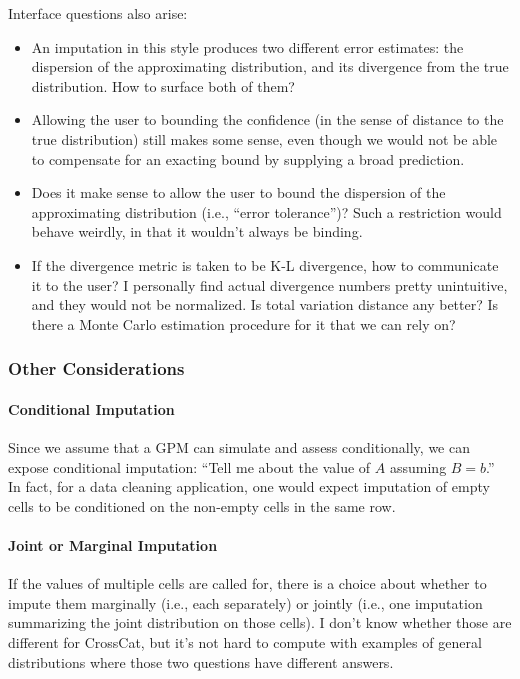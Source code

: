 \documentclass[10pt,letterpaper]{article}
\begin{document}
Interface questions also arise:
\begin{itemize}
\item An imputation in this style produces two different error
  estimates: the dispersion of the approximating distribution, and its
  divergence from the true distribution.  How to surface both of them?
\item Allowing the user to bounding the confidence (in the sense of
  distance to the true distribution) still makes some sense, even
  though we would not be able to compensate for an exacting bound by
  supplying a broad prediction.
\item Does it make sense to allow the user to bound the dispersion of
  the approximating distribution (i.e., ``error tolerance'')?  Such a
  restriction would behave weirdly, in that it wouldn't always be
  binding.
\item If the divergence metric is taken to be K-L divergence, how to
  communicate it to the user?  I personally find actual divergence
  numbers pretty unintuitive, and they would not be normalized.  Is
  total variation distance any better?  Is there a Monte Carlo
  estimation procedure for it that we can rely on?
\end{itemize}

\subsubsection{Other Considerations}

\paragraph{Conditional Imputation}
Since we assume that a GPM can simulate and assess conditionally, we
can expose conditional imputation: ``Tell me about the value of $A$
assuming $B=b$.''  In fact, for a data cleaning application, one would
expect imputation of empty cells to be conditioned on the non-empty
cells in the same row.

\paragraph{Joint or Marginal Imputation}
If the values of multiple cells are called for, there is a choice
about whether to impute them marginally (i.e., each separately) or
jointly (i.e., one imputation summarizing the joint distribution on
those cells).  I don't know whether those are different for CrossCat,
but it's not hard to compute with examples of general distributions
where those two questions have different answers.
\end{document}
